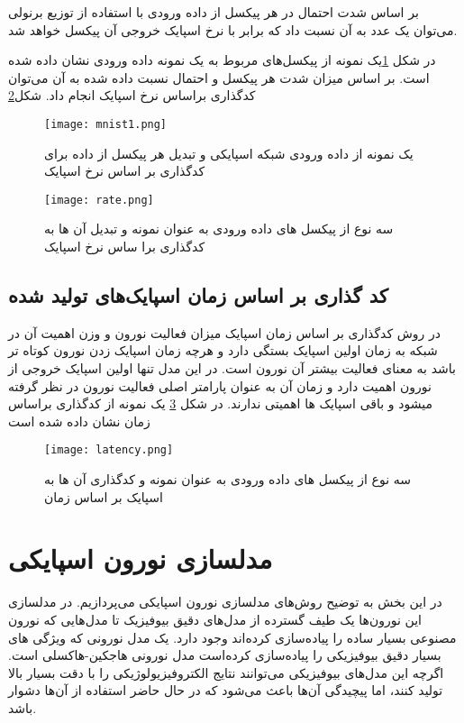 بر اساس شدت احتمال در هر پیکسل از داده ورودی با استفاده از توزیع برنولی می‌توان یک عدد به آن نسبت داد که برابر با نرخ اسپایک خروجی آن پیکسل خواهد شد.

در شکل  \ref{fig:neuron4}یک نمونه از پیکسل‌های مربوط به یک نمونه داده ورودی نشان داده شده است. بر اساس میزان شدت هر پیکسل و احتمال نسبت داده شده به آن می‌توان کدگذاری براساس نرخ اسپایک انجام داد. شکل\ref{fig:neuron5}

 \begin{figure}[htbp]
	\centering
	\texttt{[image: mnist1.png]}
	\caption{یک نمونه از داده ورودی شبکه اسپایکی و تبدیل هر پیکسل از داده برای کدگذاری بر اساس نرخ اسپایک}
	\label{fig:neuron4}
\end{figure}

 \begin{figure}[htbp]
	\centering
	\texttt{[image: rate.png]}
	\caption{ سه نوع از پیکسل های داده ورودی به عنوان نمونه و تبدیل آن ها به کدگذاری برا ساس نرخ اسپایک }
	\label{fig:neuron5}
\end{figure}

\subsection{کد گذاری بر اساس زمان اسپایک‌های تولید شده}
در روش کدگذاری بر اساس زمان اسپایک میزان فعالیت نورون و وزن اهمیت آن در شبکه به زمان اولین اسپایک بستگی دارد و هرچه زمان اسپایک زدن نورون کوتاه تر باشد به معنای فعالیت بیشتر آن نورون است. در این مدل تنها اولین اسپایک خروجی از نورون اهمیت دارد و زمان آن به عنوان پارامتر اصلی فعالیت نورون در نظر گرفته میشود و باقی اسپایک ها اهمیتی ندارند. در شکل \ref{fig:neuron6} یک نمونه از کدگذاری براساس زمان نشان داده شده است 


\begin{figure}[htbp]
	\centering
	\texttt{[image: latency.png]}
	\caption{ سه نوع از پیکسل های داده ورودی به عنوان نمونه و کدگذاری آن ها به اسپایک بر اساس زمان }
	\label{fig:neuron6}
\end{figure}

\section{مدلسازی نورون اسپایکی}

در این بخش به توضیح روش‌های مدلسازی نورون اسپایکی می‌پردازیم. در مدلسازی این نورون‌ها یک طیف گسترده از مدل‌های دقیق بیوفیزیک تا مدل‌هایی که نورون مصنوعی بسیار ساده را پیاده‌سازی کرده‌اند وجود دارد.
یک مدل نورونی که ویژگی های بسیار دقیق بیوفیزیکی را پیاده‌سازی کرده‌است مدل نورونی هاجکین-هاکسلی است. 
\citep{hodgkin1952quantitative}
اگرچه این  مدل‌های بیوفیزیکی می‌توانند نتایج الکتروفیزیولوژیکی را با دقت بسیار بالا تولید کنند، اما پیچیدگی آن‌ها باعث می‌شود که در حال حاضر استفاده از آن‌ها دشوار باشد.

